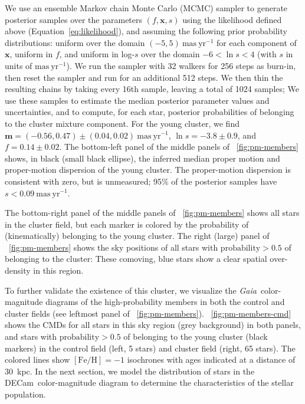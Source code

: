 \documentclass[modern]{aastex62}
\newcommand{\gaia}{\textsl{Gaia}}
\newcommand{\decam}{DECam}
\newcommand{\bs}[1]{\boldsymbol{#1}}
\newcommand{\equationname}{Equation}
\newcommand{\kpc}{\textrm{kpc}}
\newcommand{\masyr}{\ensuremath{\textrm{mas}~\textrm{yr}^{-1}}}
\newcommand{\feh}{\ensuremath{[\textrm{Fe} / \textrm{H}]}}
\begin{document}
We use an ensemble Markov chain Monte Carlo (MCMC) sampler \citep[\texttt{emcee};][]{Goodman:XX, Foreman-Mackey:2013} to generate posterior samples over the parameters $(f, \bs{x}, s)$ using the likelihood defined above (\equationname~\ref{eq:likelihood}), and assuming the following prior probability distributions: uniform over the domain $(-5, 5)~\masyr$ for each component of $\bs{x}$, uniform in $f$, and uniform in log-$s$ over the domain $-6 < \ln s < 4$ (with $s$ in units of \masyr).
We run the sampler with 32 walkers for 256 steps as burn-in, then reset the sampler and run for an additional 512 steps.
We then thin the resulting chains by taking every 16th sample, leaving a total of 1024 samples; We use these samples to estimate the median posterior parameter values and uncertainties, and to compute, for each star, posterior probabilities of belonging to the cluster mixture component.
For the young cluster, we find $\bs{m} = (-0.56,  0.47) \pm (0.04, 0.02)~\masyr$, $\ln s = -3.8 \pm 0.9$, and $f = 0.14 \pm 0.02$.
The bottom-left panel of the middle panels of \figurename~\ref{fig:pm-members} shows, in black (small black ellipse), the inferred median proper motion and proper-motion dispersion of the young cluster.
The proper-motion dispersion is consistent with zero, but is unmeasured; 95\% of the posterior samples have $s < 0.09~\masyr$.

The bottom-right panel of the middle panels of \figurename~\ref{fig:pm-members} shows all stars in the cluster field, but each marker is colored by the probability of (kinematically) belonging to the young cluster.
The right (large) panel of \figurename~\ref{fig:pm-members} shows the sky positions of all stars with $\textrm{probability} > 0.5$ of belonging to the cluster: These comoving, blue stars show a clear spatial over-density in this region.

To further validate the existence of this cluster, we visualize the \gaia\ color-magnitude diagrams of the high-probability members in both the control and cluster fields (see leftmost panel of \figurename~\ref{fig:pm-members}).
\figurename~\ref{fig:pm-members-cmd} shows the CMDs for all stars in this sky region (grey background) in both panels, and stars with $\text{probability} > 0.5$ of belonging to the young cluster (black markers) in the control field (left, 5 stars) and cluster field (right, 65 stars).
The colored lines show $\feh = -1$ isochrones with ages indicated at a distance of 30~\kpc.
In the next section, we model the distribution of stars in the \decam\ color-magnitude diagram to determine the characteristics of the stellar population.
\end{document}
